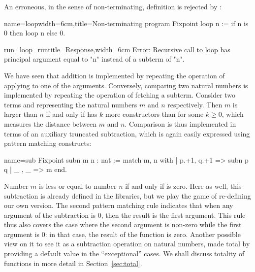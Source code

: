 
An erroneous, in the sense of non-terminating,
definition is rejected by \Coq{}:

\begin{coq-left}{name=loop}{width=6cm,title=Non-terminating program}
Fixpoint loop n :=
 if n is 0 then loop n else 0.
$~$
\end{coq-left}
\begin{coqout-right}{run=loop_run}{title=Response,width=6cm}
Error: Recursive call to loop has
principal argument equal to "n"
instead of a subterm of "n".
\end{coqout-right}

%
%

We have seen that addition is implemented by repeating the operation
of applying  to one of the arguments. Conversely, comparing two
natural numbers is implemented by repeating the operation of fetching a
subterm. Consider two terms  and  representing the natural
numbers $m$ and $n$ respectively. Then $m$ is larger than $n$ if and only
if  has $k$ more constructors than  for some $k \geq
0$, which measures the distance between $m$ and $n$. Comparison is
thus implemented in terms of an auxiliary
truncated subtraction, which is again easily expressed using pattern
matching constructs:

\begin{coq}{name=sub}{}
Fixpoint subn m n : nat :=
  match m, n with
  | p.+1, q.+1 => subn p q
  | _ , _ => m
  end.
\end{coq}
Number $m$ is less or equal to number $n$ if and only if  is
zero. Here as well, this subtraction is already defined in the
libraries, but we play the game of re-defining our own version.
The second pattern matching rule indicates that when
any argument of the subtraction is 0, then the result is
the first argument.  This %
rule thus also covers the case where the
second argument is non-zero while the first argument is 0: in that
case, the result of the function is zero.  Another possible view on
 it to see it as a subtraction operation on natural numbers,
made total by providing a default value in the ``exceptional'' cases.
We shall discuss totality of functions in more detail in
Section~\ref{sec:total}.

